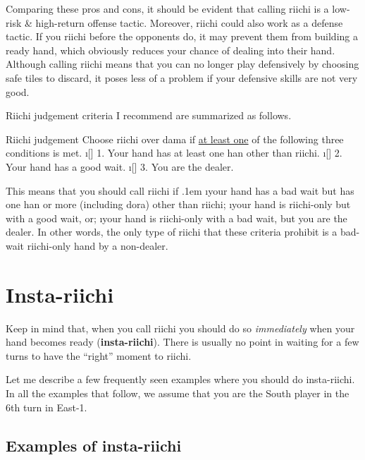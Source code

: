 \bigskip
\noindent
Comparing these pros and cons, it should be evident that calling riichi is a low-risk \& high-return offense tactic. 
Moreover, riichi could also work as a defense tactic. If you riichi before the opponents do, it may prevent them from building a ready hand, which obviously reduces your chance of dealing into their hand. 
Although calling riichi means that you can no longer play defensively by choosing safe tiles to discard, it poses less of a problem if your defensive skills are not very good. 

\bigskip

Riichi judgement criteria I recommend are summarized as follows. 

\bigskip
\begin{itembox}[c]{Riichi judgement}
Choose riichi over {\jap dama} if \underline{\large at least one} of the following three conditions is met. 
\bi
\i[] 1. Your hand has at least one {\jap han} other than riichi.
\i[] 2. Your hand has a good wait.
\i[] 3. You are the dealer.
\ei \vsps
\end{itembox}

\bigskip

\noindent This means that you should call riichi if 
\bi \itemsep.1em
\i your hand has a bad wait but has one {\jap han} or more (including {\jap dora}) other than riichi;
\i your hand is riichi-only but with a good wait, or;
\i your hand is riichi-only with a bad wait, but you are the dealer. 
\ei
In other words, the only type of riichi that these criteria prohibit is a bad-wait riichi-only hand by a non-dealer. 

\newpage
\section{Insta-riichi} 	
Keep in mind that, when you call riichi you should do so \emph{immediately} when your hand becomes ready ({\bf insta-riichi}). There is usually no point in waiting for a few turns to have the ``right'' moment to riichi. 

\bigskip
Let me describe a few frequently seen examples where you should do insta-riichi. 
In all the examples that follow, we assume that you are the South player in the 6th turn in East-1. 

\subsection{Examples of insta-riichi}

